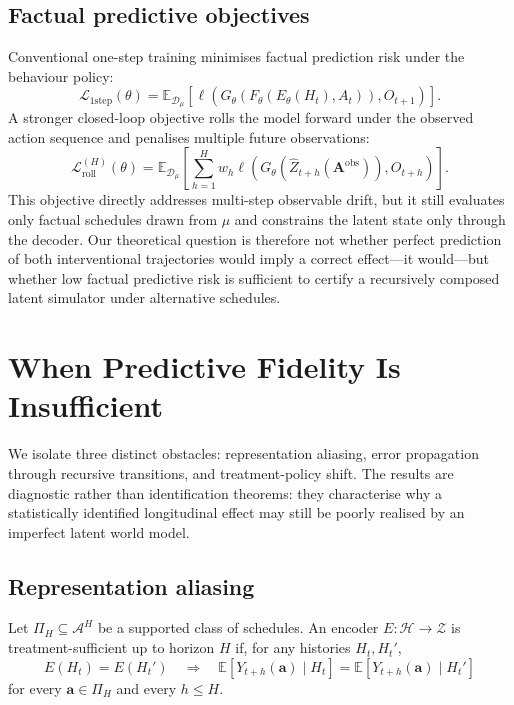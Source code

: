 \subsection{Factual predictive objectives}

Conventional one-step training minimises factual prediction risk under
the behaviour policy:
\begin{equation}
    \mathcal L_{\mathrm{1step}}(\theta)
    =\mathbb E_{\mathcal D_\mu}
    \left[
        \ell\!\left(
            G_\theta(F_\theta(E_\theta(H_t),A_t)),O_{t+1}
        \right)
    \right].
    \label{eq:one-step-loss}
\end{equation}
A stronger closed-loop objective rolls the model forward under the
observed action sequence and penalises multiple future observations:
\begin{equation}
    \mathcal L_{\mathrm{roll}}^{(H)}(\theta)
    =\mathbb E_{\mathcal D_\mu}
    \left[
        \sum_{h=1}^{H}w_h
        \ell\!\left(
            G_\theta(\widehat Z_{t+h}(\bm A^{\mathrm{obs}})),
            O_{t+h}
        \right)
    \right].
    \label{eq:rollout-loss}
\end{equation}
This objective directly addresses multi-step observable drift, but it
still evaluates only factual schedules drawn from $\mu$ and constrains
the latent state only through the decoder. Our theoretical question is
therefore not whether perfect prediction of both interventional
trajectories would imply a correct effect---it would---but whether low
factual predictive risk is sufficient to certify a recursively composed
latent simulator under alternative schedules.

\section{When Predictive Fidelity Is Insufficient}
\label{sec:theory}

We isolate three distinct obstacles: representation aliasing, error
propagation through recursive transitions, and treatment-policy shift.
The results are diagnostic rather than identification theorems: they
characterise why a statistically identified longitudinal effect may
still be poorly realised by an imperfect latent world model.

\subsection{Representation aliasing}

\begin{definition}
\label{def:treatment-sufficient}
Let $\Pi_H\subseteq\mathcal A^H$ be a supported class of schedules. An
encoder $E:\mathcal H\to\mathcal Z$ is treatment-sufficient up to
horizon $H$ if, for any histories $H_t,H_t'$,
\begin{equation}
    E(H_t)=E(H_t')
    \quad\Longrightarrow\quad
    \mathbb E[Y_{t+h}(\bm a)\mid H_t]
    =
    \mathbb E[Y_{t+h}(\bm a)\mid H_t']
    \label{eq:treatment-sufficiency}
\end{equation}
for every $\bm a\in\Pi_H$ and every $h\leq H$.
\end{definition}

